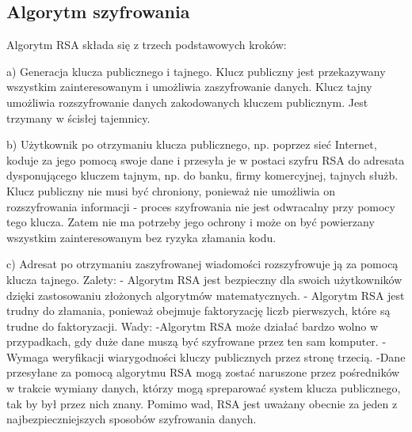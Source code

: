 \documentclass[12pt,a4paper]{article}
\begin{document}
	\subsection*{Algorytm szyfrowania}
Algorytm RSA składa się z trzech podstawowych kroków:

    a) Generacja klucza publicznego i tajnego. Klucz publiczny jest przekazywany wszystkim zainteresowanym i umożliwia zaszyfrowanie danych. Klucz tajny umożliwia rozszyfrowanie danych zakodowanych kluczem publicznym. Jest trzymany w ścisłej tajemnicy.

    b) Użytkownik po otrzymaniu klucza publicznego, np. poprzez sieć Internet, koduje za jego pomocą swoje dane i przesyła je w postaci szyfru RSA do adresata dysponującego kluczem tajnym, np. do banku, firmy komercyjnej, tajnych służb. Klucz publiczny nie musi być chroniony, ponieważ nie umożliwia on rozszyfrowania informacji - proces szyfrowania nie jest odwracalny przy pomocy tego klucza. Zatem nie ma potrzeby jego ochrony i może on być powierzany wszystkim zainteresowanym bez ryzyka złamania kodu.

    c) Adresat po otrzymaniu zaszyfrowanej wiadomości rozszyfrowuje ją za pomocą klucza tajnego.
    \newline\newline
    Zalety: \newline
    - Algorytm RSA jest bezpieczny dla swoich użytkowników dzięki zastosowaniu złożonych algorytmów matematycznych. \newline
    - Algorytm RSA jest trudny do złamania, ponieważ obejmuje faktoryzację liczb pierwszych, które są trudne do faktoryzacji. \newline
    \newline
    Wady:\newline
    -Algorytm RSA może działać bardzo wolno w przypadkach, gdy duże dane muszą być szyfrowane przez ten sam komputer. \newline
    -Wymaga weryfikacji wiarygodności kluczy publicznych przez stronę trzecią. 
    -Dane przesyłane za pomocą algorytmu RSA mogą zostać naruszone przez pośredników w trakcie wymiany danych, którzy mogą spreparować system klucza publicznego, tak by był przez nich znany. \newline
    \newline
    Pomimo wad, RSA jest uważany obecnie za jeden z najbezpieczniejszych sposobów szyfrowania danych.
    
\end{document}
